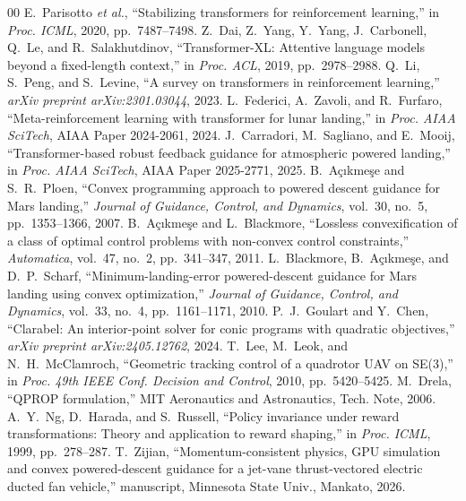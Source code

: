 \documentclass[conference]{IEEEtran}
\begin{document}
\begin{thebibliography}{00}
 E.~Parisotto \textit{et al.}, ``Stabilizing transformers for reinforcement learning,'' in \textit{Proc. ICML}, 2020, pp.~7487--7498.
 Z.~Dai, Z.~Yang, Y.~Yang, J.~Carbonell, Q.~Le, and R.~Salakhutdinov, ``Transformer-XL: Attentive language models beyond a fixed-length context,'' in \textit{Proc. ACL}, 2019, pp.~2978--2988.
 Q.~Li, S.~Peng, and S.~Levine, ``A survey on transformers in reinforcement learning,'' \textit{arXiv preprint arXiv:2301.03044}, 2023.
 L.~Federici, A.~Zavoli, and R.~Furfaro, ``Meta-reinforcement learning with transformer for lunar landing,'' in \textit{Proc. AIAA SciTech}, AIAA Paper 2024-2061, 2024.
 J.~Carradori, M.~Sagliano, and E.~Mooij, ``Transformer-based robust feedback guidance for atmospheric powered landing,'' in \textit{Proc. AIAA SciTech}, AIAA Paper 2025-2771, 2025.
 B.~A\c{c}{\i}kme\c{s}e and S.~R.~Ploen, ``Convex programming approach to powered descent guidance for Mars landing,'' \textit{Journal of Guidance, Control, and Dynamics}, vol.~30, no.~5, pp.~1353--1366, 2007.
 B.~A\c{c}{\i}kme\c{s}e and L.~Blackmore, ``Lossless convexification of a class of optimal control problems with non-convex control constraints,'' \textit{Automatica}, vol.~47, no.~2, pp.~341--347, 2011.
 L.~Blackmore, B.~A\c{c}{\i}kme\c{s}e, and D.~P.~Scharf, ``Minimum-landing-error powered-descent guidance for Mars landing using convex optimization,'' \textit{Journal of Guidance, Control, and Dynamics}, vol.~33, no.~4, pp.~1161--1171, 2010.
 P.~J.~Goulart and Y.~Chen, ``Clarabel: An interior-point solver for conic programs with quadratic objectives,'' \textit{arXiv preprint arXiv:2405.12762}, 2024.
 T.~Lee, M.~Leok, and N.~H.~McClamroch, ``Geometric tracking control of a quadrotor UAV on SE(3),'' in \textit{Proc. 49th IEEE Conf. Decision and Control}, 2010, pp.~5420--5425.
 M.~Drela, ``QPROP formulation,'' MIT Aeronautics and Astronautics, Tech. Note, 2006.
 A.~Y.~Ng, D.~Harada, and S.~Russell, ``Policy invariance under reward transformations: Theory and application to reward shaping,'' in \textit{Proc. ICML}, 1999, pp.~278--287.
 T.~Zijian, ``Momentum-consistent physics, GPU simulation and convex powered-descent guidance for a jet-vane thrust-vectored electric ducted fan vehicle,'' manuscript, Minnesota State Univ., Mankato, 2026.
\end{thebibliography}
\end{document}
